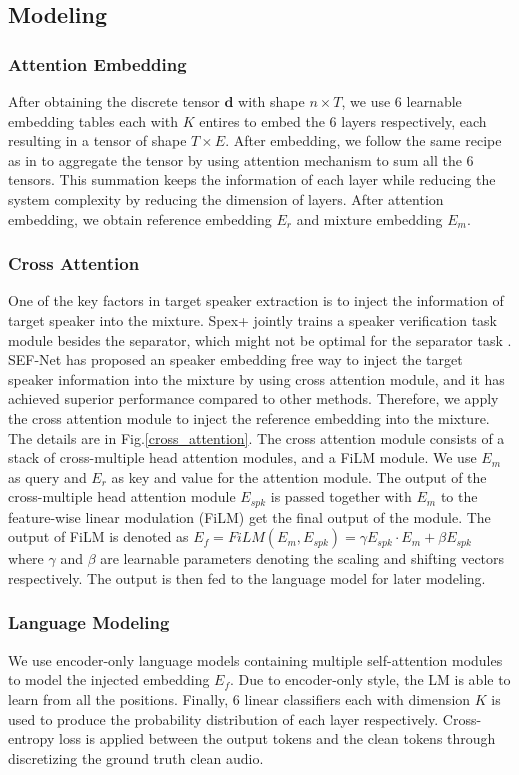 \documentclass[conference]{IEEEtran}
\begin{document}
\subsection{Modeling}
\subsubsection{Attention Embedding}
After obtaining the discrete tensor \(\bm{d}\) with shape \(n\times T\), we use 6
learnable embedding tables each with \(K\) entires to embed the 6 layers 
respectively, each resulting in a tensor of shape \(T \times E\). 
After embedding, we follow the same recipe as in \cite{dasb} to 
aggregate the tensor by using attention mechanism to sum all the 6 tensors. This summation 
keeps the information of each layer while reducing the system complexity by reducing the 
dimension of layers. After attention embedding, we obtain reference embedding \(E_r\) and 
mixture embedding \(E_m\).

\subsubsection{Cross Attention}
One of the key factors in target speaker extraction is to 
inject the information of target speaker 
into the mixture. Spex+ \cite{spex_plus} jointly trains a speaker verification task module 
besides the separator, which might not be optimal for the separator task \cite{sef_net}. SEF-Net \cite{sef_net} has proposed an speaker embedding free way to inject the 
target speaker information into the mixture by using cross attention module, and it has 
achieved superior performance compared to other methods. Therefore, we apply 
the cross attention module to inject the reference embedding into the mixture. The details 
are in Fig.\ref{cross_attention}.
The cross attention module consists of a stack of cross-multiple head attention modules, 
and a FiLM module. 
We use \(E_m\) as query and \(E_r\) as key and value for 
the attention module. The output of the cross-multiple head attention module \(E_{spk}\)
is passed together with \(E_m\) to the feature-wise linear modulation (FiLM) get the final output of the module. The output of 
FiLM is denoted as \(E_f = FiLM(E_m, E_{spk}) = \gamma E_{spk} \cdot E_m  + \beta E_{spk} \) where 
\(\gamma\) and \(\beta\) are learnable parameters denoting the scaling and shifting vectors 
respectively. The output is then fed to the language model for later modeling.  
\subsubsection{Language Modeling}
We use encoder-only language models containing multiple self-attention modules to model the injected 
embedding \(E_f\). Due to encoder-only style, the LM is able to learn from all the positions. 
Finally, 6 linear classifiers each with dimension \(K\) is used to produce the probability 
distribution of each layer respectively.
Cross-entropy loss is applied between 
the output tokens and the clean tokens through discretizing the 
ground truth clean audio. 
\end{document}

